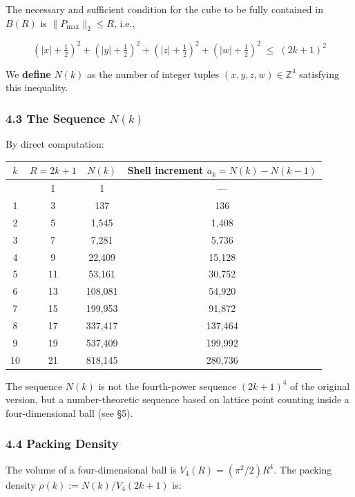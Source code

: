 \documentclass[a4paper,11pt]{article}
\theoremstyle{definition}
\begin{document}
The necessary and sufficient condition for the cube to be fully
contained in \(B(R)\) is \(\|P_{\max}\|_2 \le R\), i.e.,

\[\boxed{\;\left(|x|+\tfrac{1}{2}\right)^2 + \left(|y|+\tfrac{1}{2}\right)^2 + \left(|z|+\tfrac{1}{2}\right)^2 + \left(|w|+\tfrac{1}{2}\right)^2 \;\le\; (2k+1)^2\;}\]

We \textbf{define} \(N(k)\) as the number of integer tuples
\((x,y,z,w) \in \mathbb{Z}^4\) satisfying this inequality.

\subsubsection{\texorpdfstring{4.3 The Sequence
\(N(k)\)}{4.3 The Sequence N(k)}}\label{the-sequence-nk}

By direct computation:

{\def\LTcaptype{none} %
\begin{longtable}[]{@{}cccc@{}}
\toprule\noalign{}
\(k\) & \(R = 2k+1\) & \(N(k)\) & Shell increment
\(a_k = N(k) - N(k-1)\) \\
\midrule\noalign{}
\endhead
\bottomrule\noalign{}
\endlastfoot
0 & 1 & 1 & --- \\
1 & 3 & 137 & 136 \\
2 & 5 & 1,545 & 1,408 \\
3 & 7 & 7,281 & 5,736 \\
4 & 9 & 22,409 & 15,128 \\
5 & 11 & 53,161 & 30,752 \\
6 & 13 & 108,081 & 54,920 \\
7 & 15 & 199,953 & 91,872 \\
8 & 17 & 337,417 & 137,464 \\
9 & 19 & 537,409 & 199,992 \\
10 & 21 & 818,145 & 280,736 \\
\end{longtable}
}

The sequence \(N(k)\) is not the fourth-power sequence \((2k+1)^4\) of
the original version, but a number-theoretic sequence based on lattice
point counting inside a four-dimensional ball (see §5).

\subsubsection{4.4 Packing Density}\label{packing-density}

The volume of a four-dimensional ball is \(V_4(R) = (\pi^2/2) R^4\). The
packing density \(\rho(k) := N(k) / V_4(2k+1)\) is:
\end{document}
